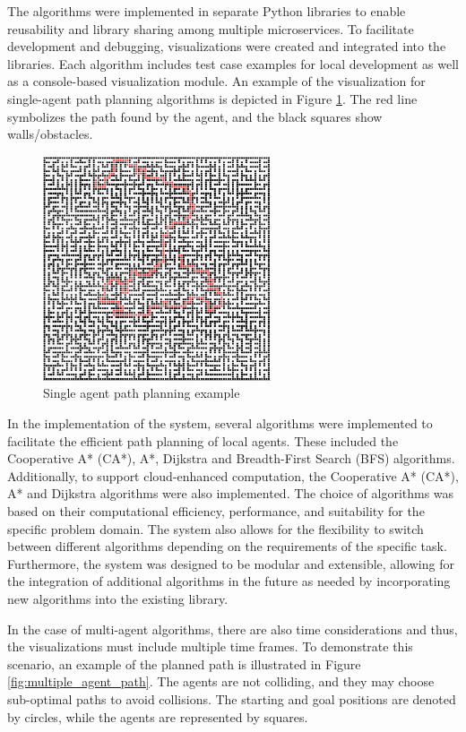 The algorithms were implemented in separate Python libraries to enable reusability and library sharing among multiple microservices.  To facilitate development and debugging, visualizations were created and integrated into the libraries. Each algorithm includes test case examples for local development as well as a console-based visualization module. An example of the visualization for single-agent path planning algorithms is depicted in Figure \ref{fig:single_agent_path}. The red line symbolizes the path found by the agent, and the black squares show walls/obstacles.

\begin{figure}[H]
    \centering
    \includegraphics[width=0.6\textwidth]{pictures/single_path_maze.png}
    \caption{ Single agent path planning example} 
    \label{fig:single_agent_path}
\end{figure}

In the implementation of the system, several algorithms were implemented to facilitate the efficient path planning of local agents. These included the Cooperative A* (CA*), A*, Dijkstra and Breadth-First Search (BFS) algorithms. Additionally, to support cloud-enhanced computation, the Cooperative A* (CA*), A* and Dijkstra algorithms were also implemented. The choice of algorithms was based on their computational efficiency, performance, and suitability for the specific problem domain. The system also allows for the flexibility to switch between different algorithms depending on the requirements of the specific task. Furthermore, the system was designed to be modular and extensible, allowing for the integration of additional algorithms in the future as needed by incorporating new algorithms into the existing library.

In the case of multi-agent algorithms, there are also time considerations and thus, the visualizations must include multiple time frames. To demonstrate this scenario, an example of the planned path is illustrated in Figure \ref{fig:multiple_agent_path}. The agents are not colliding, and they may choose sub-optimal paths to avoid collisions. The starting and goal positions are denoted by circles, while the agents are represented by squares.

